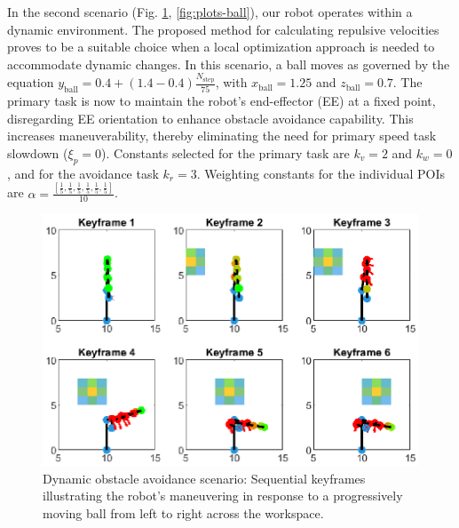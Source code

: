 \documentclass[letterpaper, 10 pt, conference]{ieeeconf}  %
\begin{document}
In the second scenario (Fig. \ref{fig:keyframes-3d-ball}, \ref{fig:plots-ball}), our robot operates within a dynamic environment. The proposed method for calculating repulsive velocities proves to be a suitable choice when a local optimization approach is needed to accommodate dynamic changes. In this scenario, a ball moves as governed by the equation \( y_{\text{ball}} = 0.4 + (1.4 - 0.4) \frac{N_{\text{step}}}{75} \),  with \( x_{\text{ball}} = 1.25 \) and \( z_{\text{ball}} = 0.7 \). The primary task is now to maintain the robot's end-effector (EE) at a fixed point, disregarding EE orientation to enhance obstacle avoidance capability. This increases maneuverability, thereby eliminating the need for primary speed task slowdown (\( \xi_{p} = 0 \)). Constants selected for the primary task are \( k_v = 2 \) and \( k_w = 0 \), and for the avoidance task \( k_r = 3 \). Weighting constants for the individual POIs are \( \alpha = \frac{[ \frac{1}{5}, \frac{1}{5}, \frac{1}{5}, \frac{1}{5}, \frac{1}{5}, \frac{1}{5} ]}{10} \).

\begin{figure}
	\centering
	\includegraphics[width=1\linewidth]{keyframes_2D_ball.eps} %
	\caption{Dynamic obstacle avoidance scenario: Sequential keyframes illustrating the robot’s maneuvering in response to a progressively moving ball from left to right across the workspace.}
	\label{fig:keyframes-3d-ball}
\end{figure}
\end{document}
